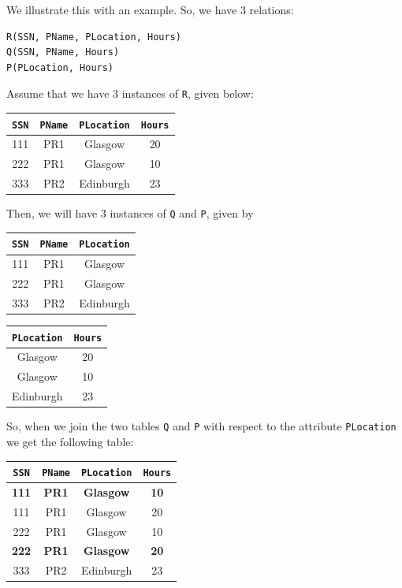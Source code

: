 \documentclass[a4paper, openany]{memoir}
\begin{document}
We illustrate this with an example. So, we have 3 relations:
\begin{Verbatim}[commandchars=+\[\]]
R(SSN, PName, PLocation, Hours)
Q(SSN, PName, Hours)
P(PLocation, Hours)
\end{Verbatim}
Assume that we have 3 instances of \texttt{R}, given below:
\begin{table}[H]
    \centering
    \begin{tabular}{|c|c|c|c|}
        \hline
        \texttt{SSN} & \texttt{PName} & \texttt{PLocation} & \texttt{Hours} \\
        \hline
        111 & PR1 & Glasgow & 20 \\
        222 & PR1 & Glasgow & 10 \\
        333 & PR2 & Edinburgh & 23 \\
        \hline
    \end{tabular}
\end{table}
Then, we will have 3 instances of \texttt{Q} and \texttt{P}, given by
\begin{table}[H]
    \centering
    \begin{tabular}{|c|c|c|}
        \hline
        \texttt{SSN} & \texttt{PName} & \texttt{PLocation} \\
        \hline
        111 & PR1 & Glasgow \\
        222 & PR1 & Glasgow \\
        333 & PR2 & Edinburgh \\
        \hline
    \end{tabular}
\end{table}
\begin{table}[H]
    \centering
    \begin{tabular}{|c|c|}
        \hline
        \texttt{PLocation} & \texttt{Hours} \\
        \hline
        Glasgow & 20 \\
        Glasgow & 10 \\
        Edinburgh & 23 \\
        \hline
    \end{tabular}
\end{table}
\noindent So, when we join the two tables \texttt{Q} and \texttt{P} with respect to the attribute \texttt{PLocation} we get the following table:
\begin{table}[H]
    \centering
    \begin{tabular}{|c|c|c|c|}
        \hline
        \texttt{SSN} & \texttt{PName} & \texttt{PLocation} & \texttt{Hours} \\
        \hline
        \textbf{111} & \textbf{PR1} & \textbf{Glasgow} & \textbf{10} \\
        111 & PR1 & Glasgow & 20 \\
        222 & PR1 & Glasgow & 10 \\
        \textbf{222} & \textbf{PR1} & \textbf{Glasgow} & \textbf{20} \\
        333 & PR2 & Edinburgh & 23 \\
        \hline
    \end{tabular}
\end{table}
\end{document}
